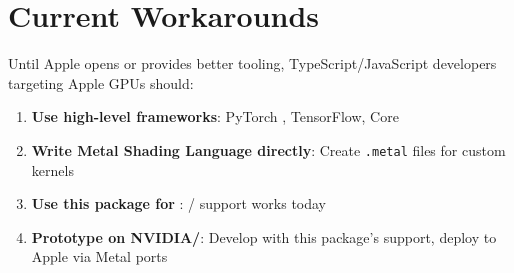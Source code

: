 \section{Current Workarounds}

Until Apple opens  or provides better tooling, TypeScript/JavaScript developers targeting Apple GPUs should:

\begin{enumerate}[noitemsep]
  \item \textbf{Use high-level frameworks}: PyTorch , TensorFlow, Core 
  \item \textbf{Write Metal Shading Language directly}: Create \texttt{.metal} files for custom kernels
  \item \textbf{Use this package for  }: / support works today
  \item \textbf{Prototype on NVIDIA/}: Develop with this package's  support, deploy to Apple via Metal ports
\end{enumerate}

